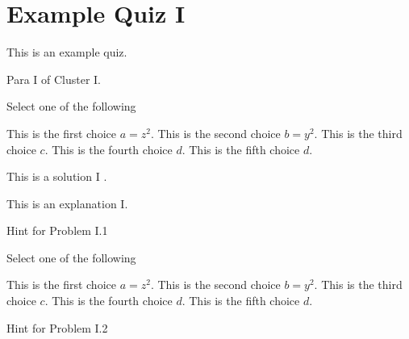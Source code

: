 \chapter{Example Quiz I}
\label{ch:quiz-ii}

\begin{preamble}
This is an example quiz.
\end{preamble}

\begin{cluster}[Cluster I]
\label{cl:quiz-ii::1}

\begin{gram}[10]
\label{quiz-ii::1::1}
Para I of Cluster I.
\end{gram}

\begin{flex}
\begin{problem}
Select one of the following
\begin{pickone}
\choice This is the first choice $a = z^2$.
\choice This is the second choice $b = y^2$.
\correctchoice This is the third choice $c$.
\correctchoice This is the fourth choice $d$.
\choice This is the fifth choice $d$.
\end{pickone}

\solution
This is a solution I .

\explain
This is an explanation I.

\end{problem}

\begin{hint}[30]
Hint  for Problem I.1
\end{hint}
\end{flex}

\begin{flex}
\begin{problem}
\label{quiz-ii:2}
Select one of the following
\begin{pickany}
\choice This is the first choice $a = z^2$.
\choice This is the second choice $b = y^2$.
\correctchoice This is the third choice $c$.
\correctchoice This is the fourth choice $d$.
\choice This is the fifth choice $d$.
\end{pickany}

\end{problem}

\begin{hint}[50]
Hint  for Problem I.2
\end{hint}
\end{flex}
\end{cluster}

